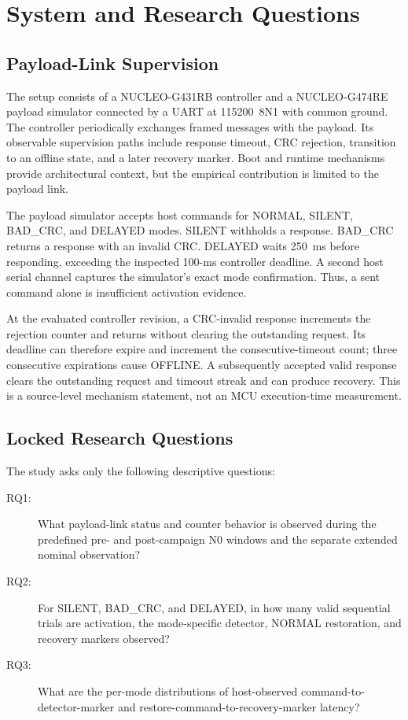 \documentclass[conference]{IEEEtran}
\begin{document}
\section{System and Research Questions}

\subsection{Payload-Link Supervision}

The setup consists of a NUCLEO-G431RB controller and a NUCLEO-G474RE payload simulator connected by a UART at 115200~8N1 with common ground. The controller periodically exchanges framed messages with the payload. Its observable supervision paths include response timeout, CRC rejection, transition to an offline state, and a later recovery marker. Boot and runtime mechanisms provide architectural context, but the empirical contribution is limited to the payload link.

The payload simulator accepts host commands for NORMAL, SILENT, BAD\_CRC, and DELAYED modes. SILENT withholds a response. BAD\_CRC returns a response with an invalid CRC. DELAYED waits 250~ms before responding, exceeding the inspected 100-ms controller deadline. A second host serial channel captures the simulator's exact mode confirmation. Thus, a sent command alone is insufficient activation evidence.

At the evaluated controller revision, a CRC-invalid response increments the rejection counter and returns without clearing the outstanding request. Its deadline can therefore expire and increment the consecutive-timeout count; three consecutive expirations cause OFFLINE. A subsequently accepted valid response clears the outstanding request and timeout streak and can produce recovery. This is a source-level mechanism statement, not an MCU execution-time measurement.

\subsection{Locked Research Questions}

The study asks only the following descriptive questions:

\begin{description}
  \item[RQ1:] What payload-link status and counter behavior is observed during the predefined pre- and post-campaign N0 windows and the separate extended nominal observation?
  \item[RQ2:] For SILENT, BAD\_CRC, and DELAYED, in how many valid sequential trials are activation, the mode-specific detector, NORMAL restoration, and recovery markers observed?
  \item[RQ3:] What are the per-mode distributions of host-observed command-to-detector-marker and restore-command-to-recovery-marker latency?
\end{description}
\end{document}

